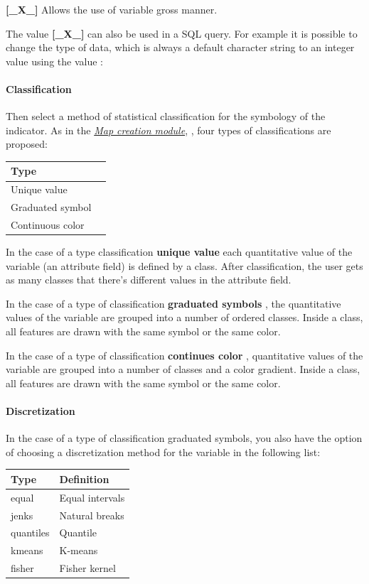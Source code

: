 \documentclass[letterpaper,10pt,english]{sphinxmanual}
\begin{document}
\textbf{{[}\_X\_{]}} Allows the use of variable gross manner.

The value \textbf{{[}\_X\_{]}} can also be used in a SQL query. For example it is possible to change the type of data, which is always a default character string to an integer value using the value : 
\paragraph{Classification}

Then select a method of statistical classification for the symbology of the indicator. As in the {\hyperref[maps/index::doc]{\emph{\emph{Map creation module}}}}, , four types of classifications are proposed:

\begin{tabulary}{\linewidth}{|L|L|}
\hline

\textbf{Type}
 & \\
\hline
Unique value
 & \\
\hline
Graduated symbol
 & \\
\hline
Continuous color
 & \\
\hline\end{tabulary}


In the case of a type classification \textbf{unique value} each quantitative value of the variable (an attribute field) is defined by a class. After classification, the user gets as many classes that there's different values ​​in the attribute field.

In the case of a type of classification \textbf{graduated symbols} , the quantitative values ​​of the variable are grouped into a number of ordered classes. Inside a class, all features are drawn with the same symbol or the same color.

In the case of a type of classification \textbf{continues color} , quantitative values ​​of the variable are grouped into a number of classes and a color gradient. Inside a class, all features are drawn with the same symbol or the same color.
\paragraph{Discretization}

In the case of a type of classification graduated symbols, you also have the option of choosing a discretization method for the variable in the following list:

\begin{tabulary}{\linewidth}{|L|L|}
\hline

\textbf{Type}
 & 
\textbf{Definition}
\\
\hline
equal
 & 
Equal intervals
\\
\hline
jenks
 & 
Natural breaks
\\
\hline
quantiles
 & 
Quantile
\\
\hline
kmeans
 & 
K-means
\\
\hline
fisher
 & 
Fisher kernel
\\
\hline\end{tabulary}
\end{document}

